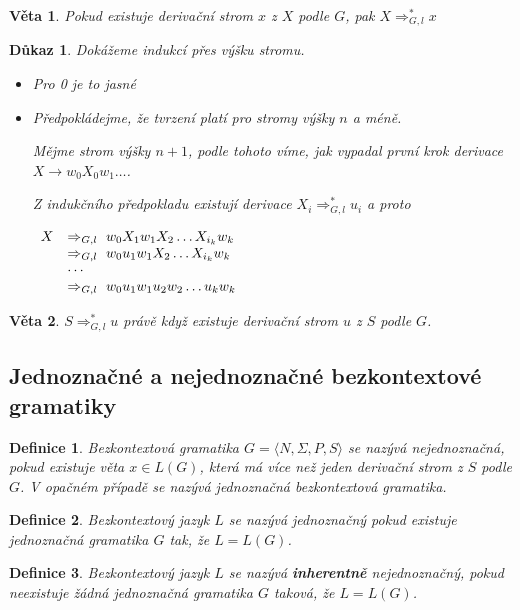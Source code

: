 \documentclass[10pt, a4paper, titlepage]{article}
\theoremstyle{note}
\newtheorem{veta}{Věta}
\newtheorem{definice}{Definice}
\newtheorem{dukaz}{Důkaz}
\begin{document}
\begin{veta}
Pokud existuje derivační strom $x$ z $X$ podle $G$, pak $X \Rightarrow_{G,l}^* x$
\end{veta}
\begin{dukaz}
Dokážeme indukcí přes výšku stromu.
\begin{itemize}
\item
Pro 0 je to jasné
\item
Předpokládejme, že tvrzení platí pro stromy výšky $n$ a méně.

Mějme strom výšky $n+1$, podle tohoto víme, jak vypadal první krok derivace $X \rightarrow w_0X_0w_1 \ldots$.

Z indukčního předpokladu existují derivace $X_i \Rightarrow_{G,l}^* u_i$ a proto

$
\begin{array}{l l}
X & \Rightarrow_{G,l}\  w_0X_1w_1X_2 \ldots X_{i_k}w_k \\
& \Rightarrow_{G,l}\  w_0u_1w_1X_2 \ldots X_{i_k}w_k \\
& \cdots \\
& \Rightarrow_{G,l}\  w_0u_1w_1u_2w_2 \ldots u_kw_k
\end{array}
$
\end{itemize}
\end{dukaz}

\begin{veta}
$S\Rightarrow_{G,l}^* u$ právě když existuje derivační strom $u$ z $S$ podle $G$.
\end{veta}

\subsection{Jednoznačné a nejednoznačné bezkontextové gramatiky}

\begin{definice}
Bezkontextová gramatika $G = \langle N,\Sigma,P,S \rangle$ se nazývá nejednoznačná, pokud existuje věta $x \in L(G)$, která má více než jeden derivační strom z $S$ podle $G$. V opačném případě se nazývá jednoznačná bezkontextová gramatika.
\end{definice}

\begin{definice}
Bezkontextový jazyk $L$ se nazývá jednoznačný pokud existuje jednoznačná gramatika $G$ tak, že $L=L(G)$.
\end{definice}

\begin{definice}
Bezkontextový jazyk $L$ se nazývá \textbf{inherentně} nejednoznačný, pokud neexistuje žádná jednoznačná gramatika $G$ taková, že $L=L(G)$.
\end{definice}
\end{document}
